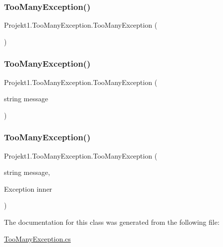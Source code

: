 \subsubsection{\texorpdfstring{TooManyException()}{TooManyException()}\hspace{0.1cm}{\footnotesize\ttfamily [1/3]}}
{\footnotesize\ttfamily Projekt1.\+Too\+Many\+Exception.\+Too\+Many\+Exception (\begin{DoxyParamCaption}{ }\end{DoxyParamCaption})}

\mbox{\label{class_projekt1_1_1_too_many_exception_af034f5bbeab7d17ce66c25a9ec10a9a3}} 
\subsubsection{\texorpdfstring{TooManyException()}{TooManyException()}\hspace{0.1cm}{\footnotesize\ttfamily [2/3]}}
{\footnotesize\ttfamily Projekt1.\+Too\+Many\+Exception.\+Too\+Many\+Exception (\begin{DoxyParamCaption}\item[{string}]{message }\end{DoxyParamCaption})}

\mbox{\label{class_projekt1_1_1_too_many_exception_a12854ed0fecd600153f26fb474e99b88}} 
\subsubsection{\texorpdfstring{TooManyException()}{TooManyException()}\hspace{0.1cm}{\footnotesize\ttfamily [3/3]}}
{\footnotesize\ttfamily Projekt1.\+Too\+Many\+Exception.\+Too\+Many\+Exception (\begin{DoxyParamCaption}\item[{string}]{message,  }\item[{Exception}]{inner }\end{DoxyParamCaption})}



The documentation for this class was generated from the following file\+:\begin{DoxyCompactItemize}
\item 
\mbox{\hyperlink{_too_many_exception_8cs}{Too\+Many\+Exception.\+cs}}\end{DoxyCompactItemize}
